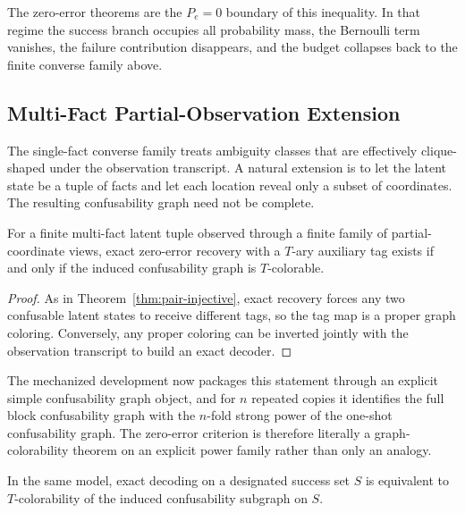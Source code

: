 The zero-error theorems are the $P_e=0$ boundary of this inequality. In that regime the success branch occupies all probability mass, the Bernoulli term vanishes, the failure contribution disappears, and the budget collapses back to the finite converse family above.

\subsection{Multi-Fact Partial-Observation Extension}\label{sec:multifact-extension}

The single-fact converse family treats ambiguity classes that are effectively clique-shaped under the observation transcript. A natural extension is to let the latent state be a tuple of facts and let each location reveal only a subset of coordinates. The resulting confusability graph need not be complete.

\begin{theorem}\label{thm:multifact-colorability}
For a finite multi-fact latent tuple observed through a finite family of partial-coordinate views, exact zero-error recovery with a $T$-ary auxiliary tag exists if and only if the induced confusability graph is $T$-colorable.
\end{theorem}

\begin{proof}
As in Theorem~\ref{thm:pair-injective}, exact recovery forces any two confusable latent states to receive different tags, so the tag map is a proper graph coloring. Conversely, any proper coloring can be inverted jointly with the observation transcript to build an exact decoder.
\end{proof}

The mechanized development now packages this statement through an explicit simple confusability graph object, and for $n$ repeated copies it identifies the full block confusability graph with the $n$-fold strong power of the one-shot confusability graph. The zero-error criterion is therefore literally a graph-colorability theorem on an explicit power family rather than only an analogy.

\begin{theorem}\label{thm:multifact-success-set}
In the same model, exact decoding on a designated success set $S$ is equivalent to $T$-colorability of the induced confusability subgraph on $S$.
\end{theorem}

